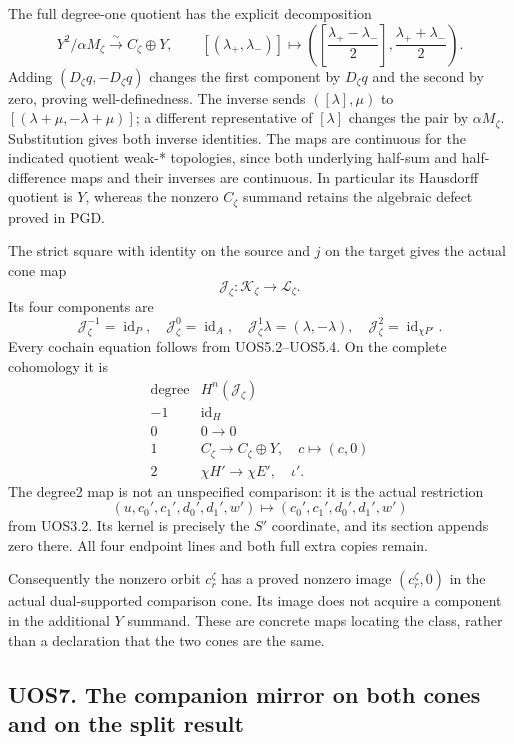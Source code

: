 The full degree-one quotient has the explicit decomposition \[
 \boxed{
 Y^2/\alpha M_\zeta
 \xrightarrow{\sim} C_\zeta\oplus Y,\qquad
 [(\lambda_+,\lambda_-)]
 \longmapsto
 \left(
 \left[\frac{\lambda_+-\lambda_-}{2}\right],
 \frac{\lambda_++\lambda_-}{2}
 \right).}
 \tag{UOS6.3}
\] Adding \((D_\zeta q,-D_\zeta q)\) changes the first component by
\(D_\zeta q\) and the second by zero, proving well-definedness. The
inverse sends \(([\lambda],\mu)\) to \([(\lambda+\mu,-\lambda+\mu)]\); a
different representative of \([\lambda]\) changes the pair by
\(\alpha M_\zeta\). Substitution gives both inverse identities. The maps
are continuous for the indicated quotient weak-* topologies, since both
underlying half-sum and half-difference maps and their inverses are
continuous. In particular its Hausdorff quotient is \(Y\), whereas the
nonzero \(C_\zeta\) summand retains the algebraic defect proved in PGD.

The strict square with identity on the source and \(j\) on the target
gives the actual cone map \[
 \mathcal J_\zeta:\mathcal K_\zeta\to\mathcal L_\zeta.
\] Its four components are \[
 \mathcal J_\zeta^{-1}=\operatorname{id}_P,\quad
 \mathcal J_\zeta^0=\operatorname{id}_A,\quad
 \mathcal J_\zeta^1\lambda=(\lambda,-\lambda),\quad
 \mathcal J_\zeta^2=\operatorname{id}_{\chi P'}.
 \tag{UOS6.4}
\] Every cochain equation follows from UOS5.2--UOS5.4. On the complete
cohomology it is \[
 \begin{array}{c|c}
 \text{degree}&H^n(\mathcal J_\zeta)\\ \hline
 -1&\operatorname{id}_H\\
 0&0\to0\\
 1&C_\zeta\to C_\zeta\oplus Y,\quad c\mapsto(c,0)\\
 2&\chi H'\to\chi E',\quad\iota'.
 \end{array}
 \tag{UOS6.5}
\] The degree2 map is not an unspecified comparison: it is the actual
restriction \[
 (u,c_0',c_1',d_0',d_1',w')
 \longmapsto(c_0',c_1',d_0',d_1',w')
\] from UOS3.2. Its kernel is precisely the \(S'\) coordinate, and its
section appends zero there. All four endpoint lines and both full extra
copies remain.

Consequently the nonzero orbit \(c_r^\zeta\) has a proved nonzero image
\((c_r^\zeta,0)\) in the actual dual-supported comparison cone. Its
image does not acquire a component in the additional \(Y\) summand.
These are concrete maps locating the class, rather than a declaration
that the two cones are the same.

\subsection{UOS7. The companion mirror on both cones and on the split
result}\label{uos7.-the-companion-mirror-on-both-cones-and-on-the-split-result}

